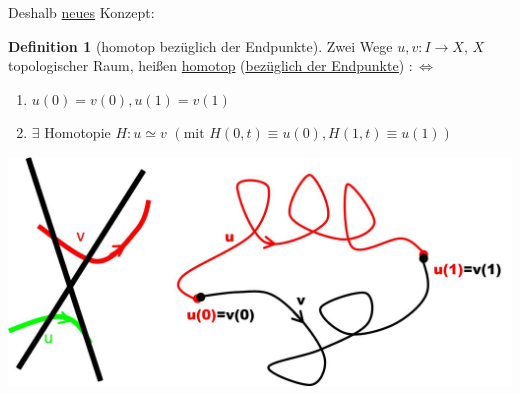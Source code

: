 \documentclass[a4paper,11pt,notitlepage]{report}
\theoremstyle{remark}
\theoremstyle{definition}
\newtheorem{definition}{Definition}[chapter]
\begin{document}
Deshalb \underline{neues} Konzept:

\begin{definition}[homotop bezüglich der Endpunkte]
	Zwei Wege $u,v \colon I \rightarrow X$, $X$ topologischer Raum, heißen \underline{homotop} (\underline{\underline{bezüglich der Endpunkte}})
	$:\Leftrightarrow$
	\begin{enumerate}
		\item $u(0) = v(0), u(1) = v(1)$
		\item $\exists$ Homotopie $H \colon u \simeq v$ $\left(\text{mit } H(0,t) \equiv u(0), H(1,t) \equiv u(1)\right)$
	\end{enumerate}
	\includegraphics[scale=0.4]{images/Homotop_Endpunkte.jpg}		
\end{definition}
\end{document}
